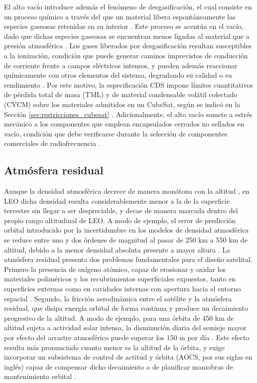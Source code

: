 El alto vacío introduce además el fenómeno de desgasificación, el cual consiste en un proceso químico a través del que un material libera espontáneamente las especies gaseosas retenidas en su interior \cite{leybold2022}. Este proceso se acentúa en el vacío, dado que dichas especies gaseosas se encuentran menos ligadas al material que a presión atmosférica \cite{chiggiato2020}. Los gases liberados por desgasificación resultan susceptibles a la ionización, condición que puede generar caminos imprevistos de conducción de corriente frente a campos eléctricos intensos, y pueden además reaccionar químicamente con otros elementos del sistema, degradando su calidad o su rendimiento \cite{mks2024}. Por este motivo, la especificación CDS impone límites cuantitativos de pérdida total de masa (TML) y de material condensable volátil colectado (CVCM) sobre los materiales admitidos en un CubeSat, según se indicó en la Sección \ref{sec:restricciones_cubesat} \cite{cubesatspecs}. Adicionalmente, el alto vacío somete a estrés mecánico a los componentes que emplean encapsulados cerrados no sellados en vacío, condición que debe verificarse durante la selección de componentes comerciales de radiofrecuencia \cite{chiggiato2020}.

\subsection{Atmósfera residual}
Aunque la densidad atmosférica decrece de manera monótona con la altitud \cite{benson2021}, en LEO dicha densidad resulta considerablemente menor a la de la superficie terrestre sin llegar a ser despreciable, y decae de manera marcada dentro del propio rango altitudinal de LEO. A modo de ejemplo, el error de predicción orbital introducido por la incertidumbre en los modelos de densidad atmosférica se reduce entre uno y dos órdenes de magnitud al pasar de 250 km a 550 km de altitud, debido a la menor densidad absoluta presente a mayor altura \cite{ray2022vleo}. La atmósfera residual presenta dos problemas fundamentales para el diseño satelital. Primero la presencia de oxígeno atómico, capaz de erosionar y oxidar los materiales poliméricos y los recubrimientos superficiales expuestos, tanto en superficies externas como en cavidades internas con apertura hacia el entorno espacial \cite{banks2003}. Segundo, la fricción aerodinámica entre el satélite y la atmósfera residual, que disipa energía orbital de forma continua y produce un decaimiento progresivo de la altitud. A modo de ejemplo, para una órbita de 450 km de altitud sujeta a actividad solar intensa, la disminución diaria del semieje mayor por efecto del arrastre atmosférico puede superar los 150 m por día \cite{thomassin2017}. Este efecto resulta más pronunciado cuanto menor es la altitud de la órbita, y exige incorporar un subsistema de control de actitud y órbita (AOCS, por sus siglas en inglés) capaz de compensar dicho decaimiento o de planificar maniobras de mantenimiento orbital \cite{thomassin2017}.

